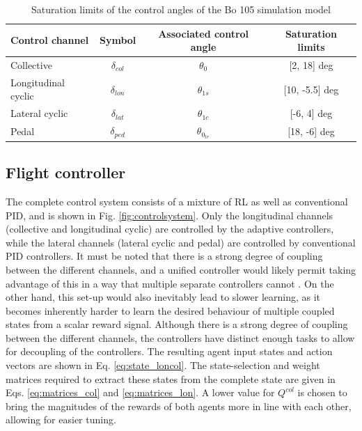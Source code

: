 \begin{table}[ht]
    \centering
    \caption{Saturation limits of the control angles of the Bo 105 simulation model \cite{BO105DataSheet}}
    \label{tab:heli_control_ranges}
    \begin{tabular}{@{}lccc@{}}
    \toprule
    Control channel     & Symbol         & Associated control angle  & Saturation limits  \\ \midrule
    Collective          & $\delta_{col}$ & $\theta_0$        & [2, 18] deg   \\
    Longitudinal cyclic & $\delta_{lon}$ & $\theta_{1s}$     & [10, -5.5] deg \\
    Lateral cyclic      & $\delta_{lat}$ & $\theta_{1c}$     & [-6, 4] deg   \\
    Pedal               & $\delta_{ped}$ & $\theta_{0_{tr}}$ & [18, -6] deg  \\ \bottomrule
    \end{tabular}
\end{table}

\subsection{Flight controller} \label{ssec:controllerdesign}
The complete control system consists of a mixture of RL as well as conventional PID, and is shown in Fig. \ref{fig:controlsystem}. Only the longitudinal channels (collective and longitudinal cyclic) are controlled by the adaptive controllers, while the lateral channels (lateral cyclic and pedal) are controlled by conventional PID controllers. It must be noted that there is a strong degree of coupling between the different channels, and a unified controller would likely permit taking advantage of this in a way that multiple separate controllers cannot \cite{Enns2003a}. On the other hand, this set-up would also inevitably lead to slower learning, as it becomes inherently harder to learn the desired behaviour of multiple coupled states from a scalar reward signal. Although there is a strong degree of coupling between the different channels, the controllers have distinct enough tasks to allow for decoupling of the controllers. The resulting agent input states and action vectors are shown in Eq. \eqref{eq:state_loncol}. The state-selection and weight matrices required to extract these states from the complete state are given in Eqs. \eqref{eq:matrices_col} and \eqref{eq:matrices_lon}. A lower value for $Q^{col}$ is chosen to bring the magnitudes of the rewards of both agents more in line with each other, allowing for easier tuning.

